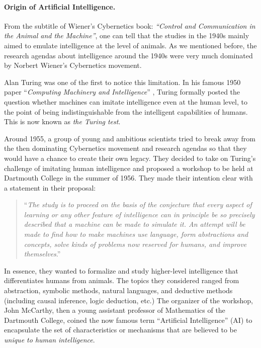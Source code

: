 \documentclass[../../book-main.tex]{subfiles}
\begin{document}
\paragraph{Origin of Artificial Intelligence.}
From the subtitle of Wiener's Cybernetics book: {\em ``Control and Communication in the Animal and the Machine''}, one can tell that the studies in the 1940s mainly aimed to emulate intelligence at the level of animals. As we mentioned before, the research agendas about intelligence around the 1940s were very much dominated by Norbert Wiener's Cybernetics movement. 

Alan Turing was one of the first to notice this limitation. In his famous 1950 paper ``{\em Computing Machinery and Intelligence}'' \cite{Turing-1950}, Turing formally posted the question whether machines can imitate intelligence even at the human level, to the point of being indistinguishable from the intelligent capabilities of humans. This is now known as {\em the Turing test}. 

Around 1955, a group of young and ambitious scientists tried to break away from the then dominating Cybernetics movement and research agendas so that they would have a chance to create their own legacy. They decided to take on Turing's challenge of imitating human intelligence and proposed a workshop to be held at Dartmouth College in the summer of 1956. They made their intention clear with a statement in their proposal: 
\begin{quote}
    ``{\em The study is to proceed on the basis of the conjecture that every aspect of learning or any other feature of intelligence can in principle be so precisely described that a machine can be made to simulate it. An attempt will be made to find how to make machines use language, form abstractions and concepts, solve kinds of problems now reserved for humans, and improve themselves}.'' 
\end{quote}
In essence, they wanted to formalize and study higher-level intelligence that differentiates humans from animals. The topics they considered ranged from abstraction, symbolic methods, natural languages, and deductive methods (including causal inference, logic deduction, etc.) The organizer of the workshop, John McCarthy, then a young assistant professor of Mathematics of the Dartmouth College, coined the now famous term ``Artificial Intelligence'' (AI) to encapsulate the set of characteristics or mechanisms that are believed to be {\em unique to human intelligence}. 
\end{document}
